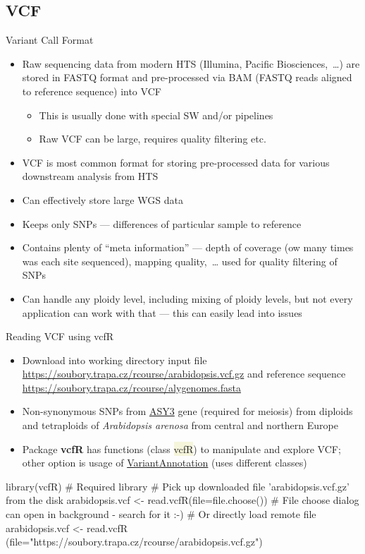 \documentclass[compress, xelatex, 11pt, xcolor=svgnames, aspectratio=169,
	hyperref={
		bookmarks=true,
		unicode=true,
		colorlinks=true,
		pdftitle={Molecular data in R},
		plainpages=false,
		pdfauthor={Vojtech Zeisek},
		pdfsubject={Course about phylogeny and evolution in R},
		pdfcreator={XeLaTeX},
		pdfkeywords={R, evolution, phylogeny, molecular data},
		linkcolor=Crimson, %
		anchorcolor=Magenta, %
		citecolor=Magenta, %
		filecolor=Magenta, %
		menucolor=Magenta, %
		urlcolor=DodgerBlue, %
		},
	url={hyphens, lowtilde} %
	]{beamer}
\renewcommand{\texttt}[1]{\colorbox{Beige}{{\ttfamily #1}}}
\begin{document}
\subsection{VCF}

\begin{frame}{Variant Call Format}
	\begin{itemize}
		\item Raw sequencing data from modern HTS (Illumina, Pacific Biosciences,~\ldots) are stored in FASTQ format and pre-processed via BAM (FASTQ reads aligned to reference sequence) into VCF
		\begin{itemize}
			\item This is usually done with special SW and/or pipelines
			\item Raw VCF can be large, requires quality filtering etc.
		\end{itemize}
		\item VCF is most common format for storing pre-processed data for various downstream analysis from HTS
		\item Can effectively store large WGS data
		\item Keeps only SNPs --- differences of particular sample to reference
		\item Contains plenty of \enquote{meta information} --- depth of coverage (ow many times was each site sequenced), mapping quality,~\ldots{ }used for quality filtering of SNPs
		\item Can handle any ploidy level, including mixing of ploidy levels, but not every application can work with that --- this can easily lead into issues
	\end{itemize}
\end{frame}

\begin{frame}[fragile]{Reading VCF using vcfR}
	\begin{itemize}
		\item Download into working directory input file \url{https://soubory.trapa.cz/rcourse/arabidopsis.vcf.gz} and reference sequence \url{https://soubory.trapa.cz/rcourse/alygenomes.fasta}
		\item Non-synonymous SNPs from \href{https://www.arabidopsis.org/servlets/TairObject?type=locus&name=At2g46980}{ASY3} gene (required for meiosis) from diploids and tetraploids of \textit{Arabidopsis arenosa} from central and northern Europe
		\item Package \textbf{vcfR} has functions (class \texttt{vcfR}) to manipulate and explore VCF; other option is usage of \href{https://bioconductor.org/packages/release/bioc/html/VariantAnnotation.html}{VariantAnnotation} (uses different classes)
	\end{itemize}
	\begin{spluscode}
    library(vcfR) # Required library
    # Pick up downloaded file 'arabidopsis.vcf.gz' from the disk
    arabidopsis.vcf <- read.vcfR(file=file.choose())
    # File choose dialog can open in background - search for it :-)
    # Or directly load remote file
    arabidopsis.vcf <- read.vcfR
      (file="https://soubory.trapa.cz/rcourse/arabidopsis.vcf.gz")
	\end{spluscode}
\end{frame}
\end{document}

